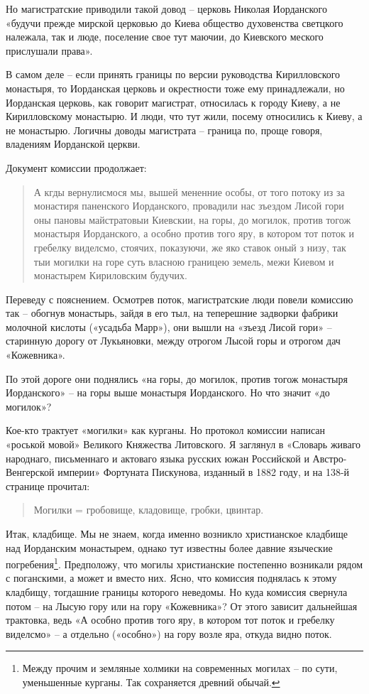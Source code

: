Но магистратские приводили такой довод – церковь Николая Иорданского «будучи прежде мирской церковью до Киева общество духовенства светцкого належала, так и люде, поселение свое тут маючии, до Киевского меского прислушали права».

В самом деле – если принять границы по версии руководства Кирилловского монастыря, то Иорданская церковь и окрестности тоже ему принадлежали, но Иорданская церковь, как говорит магистрат, относилась к городу Киеву, а не Кирилловскому монастырю. И люди, что тут жили, посему относились к Киеву, а не монастырю. Логичны доводы магистрата – граница по, проще говоря, владениям Иорданской церкви.
  
Документ комиссии продолжает:

\begin{quotation}
А кгды вернулисмося мы, вышей мененние особы, от того потоку из за монастиря паненского Иорданского, провадили нас зъездом Лисой гори оны пановы майстратовыи Киевскии, на горы, до могилок, против тогож монастыря Иорданского, а особно против того яру, в котором тот поток и гребелку виделсмо, стоячих, показуючи, же яко ставок оный з низу, так тыи могилки на горе суть власною границею земель, межи Киевом и монастырем Кириловским будучих.
\end{quotation}

Переведу с пояснением. Осмотрев поток, магистратские люди повели комиссию так – обогнув монастырь, зайдя в его тыл, на теперешние задворки фабрики молочной кислоты («усадьба Марр»), они вышли на «зъезд Лисой гори» – старинную дорогу от Лукьяновки, между отрогом Лысой горы и отрогом дач «Кожевника».

По этой дороге они поднялись «на горы, до могилок, против тогож монастыря Иорданского» – на горы выше монастыря Иорданского. Но что значит «до могилок»?

Кое-кто трактует «могилки» как курганы. Но протокол комиссии написан «роськой мовой» Великого Княжества Литовского. Я заглянул в «Словарь живаго народнаго, письменнаго и актоваго языка русских южан Российской и Австро-Венгерской империи» Фортуната Пискунова, изданный в 1882 году, и на 138-й странице прочитал:

\begin{quotation}
Могилки = гробовище, кладовище, гробки, цвинтар.
\end{quotation}

Итак, кладбище. Мы не знаем, когда именно возникло христианское кладбище над Иорданским монастырем, однако тут известны более давние языческие погребения\footnote{Между прочим и земляные холмики на современных могилах – по сути, уменьшенные курганы. Так сохраняется древний обычай.}. Предположу, что могилы христианские постепенно возникали рядом с поганскими, а может и вместо них. Ясно, что комиссия поднялась к этому кладбищу, тогдашние границы которого неведомы. Но куда комиссия свернула потом – на Лысую гору или на гору «Кожевника»? От этого зависит дальнейшая трактовка, ведь «А особно против того яру, в котором тот поток и гребелку виделсмо» – а отдельно («особно») на гору возле яра, откуда видно поток. 

